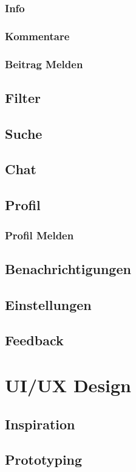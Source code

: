 \subsubsection{Info}
\subsubsection{Kommentare}
\subsubsection{Beitrag Melden}


\subsection{Filter}
\subsection{Suche}
\subsection{Chat}
\subsection{Profil}
\subsubsection{Profil Melden}

\subsection{Benachrichtigungen}
\subsection{Einstellungen}
\subsection{Feedback}


\section{UI/UX Design}
\subsection{Inspiration}

\subsection{Prototyping}
